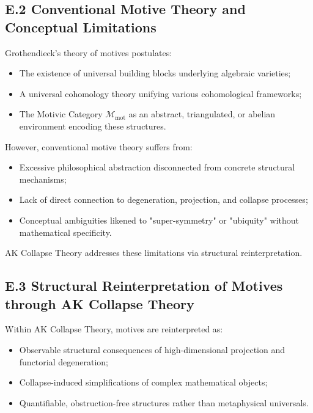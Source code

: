 \documentclass[11pt]{article}
\begin{document}
\subsection*{E.2 Conventional Motive Theory and Conceptual Limitations}

Grothendieck's theory of motives postulates:

\begin{itemize}
    \item The existence of universal building blocks underlying algebraic varieties;
    \item A universal cohomology theory unifying various cohomological frameworks;
    \item The Motivic Category $\mathcal{M}_{\mathrm{mot}}$ as an abstract, triangulated, or abelian environment encoding these structures.
\end{itemize}

However, conventional motive theory suffers from:

\begin{itemize}
    \item Excessive philosophical abstraction disconnected from concrete structural mechanisms;
    \item Lack of direct connection to degeneration, projection, and collapse processes;
    \item Conceptual ambiguities likened to "super-symmetry" or "ubiquity" without mathematical specificity.
\end{itemize}

AK Collapse Theory addresses these limitations via structural reinterpretation.

\subsection*{E.3 Structural Reinterpretation of Motives through AK Collapse Theory}

Within AK Collapse Theory, motives are reinterpreted as:

\begin{itemize}
    \item Observable structural consequences of high-dimensional projection and functorial degeneration;
    \item Collapse-induced simplifications of complex mathematical objects;
    \item Quantifiable, obstruction-free structures rather than metaphysical universals.
\end{itemize}
\end{document}
